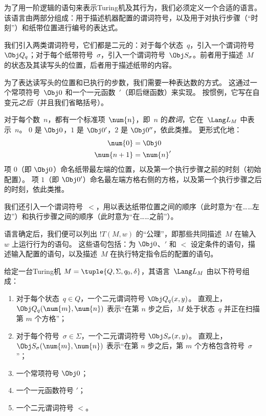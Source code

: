\documentclass[../../../include/open-logic-section]{subfiles}
\begin{document}

\begin{explain}
为了用一阶逻辑的语句来表示Turing机及其行为，我们必须定义一个合适的语言。
该语言由两部分组成：用于描述机器配置的谓词符号，以及用于对执行步骤（“时刻”）和纸带位置进行编号的表达式。

我们引入两类谓词符号，它们都是二元的：对于每个状态~\(q\)，引入一个谓词符号~\(\Obj Q_q\)；对于每个纸带符号~\(\sigma\)，引入一个谓词符号~\(\Obj S_\sigma\)。前者用于描述~\(M\) 的状态及其读写头的位置，后者用于描述纸带的内容。

为了表达读写头的位置和已执行的步数，我们需要一种表达数的方式。
这通过一个常项符号~\(\Obj 0\) 和一个一元函数~\(\prime\)（即后继函数）来实现。
按惯例，它写在自变元\emph{之后}（并且我们省略括号）。

对于每个数~\(n\)，都有一个标准项~\(\num{n}\)，即~\(n\) 的\emph{数词}，它在~\(\Lang L_M\) 中表示~\(n\)。
\(\num{0}\) 是 \(\Obj 0\)，\(\num{1}\) 是 \(\Obj 0'\)，\(\num{2}\) 是 \(\Obj 0''\)，依此类推。
更形式化地：
\begin{align*}
\num{0} & = \Obj 0 \\
\num{n+1} &= \num{n}'
\end{align*}
项 \(\num{0}\)（即 \(\Obj 0\)）命名纸带最左端的位置，以及第一个执行步骤之前的时刻（初始配置）。
项 \(\num{1}\)（即 \(\Obj 0'\)）命名最左端方格右侧的方格，以及第一个执行步骤之后的时刻，依此类推。

我们还引入一个谓词符号~\(<\)，用以表达纸带位置之间的顺序（此时意为“在……左边”）和执行步骤之间的顺序（此时意为“在……之前”）。

语言确定后，我们便可以列出 \(!T(M, w)\) 的“公理”，即那些共同描述~\(M\) 在输入~\(w\) 上运行行为的语句。
这些语句包括：为 \(\Obj 0\)、\(\prime\) 和 \(<\) 设定条件的语句，描述输入配置的语句，以及描述~\(M\) 在执行特定指令后的配置的语句。
\end{explain}

\begin{defn}
给定一台Turing机 $M = \tuple{Q, \Sigma, q_0, \delta}$，其语言~\(\Lang L_M\) 由以下符号组成：
\begin{enumerate}
\item 对于每个状态~\(q \in Q\)，一个二元谓词符号 \(\Obj Q_q(x, y)\)。
  直观上，$\Obj Q_q(\num{m}, \num{n})$ 表示“在第 \(n\) 步之后，\(M\) 处于状态~\(q\) 并正在扫描第 \(m\) 个方格”；
\item 对于每个符号~\(\sigma\in \Sigma\)，一个二元谓词符号 \(\Obj S_\sigma(x, y)\)。
  直观上，$\Obj S_\sigma(\num{m},
  \num{n})$ 表示“在第 \(n\) 步之后，第 \(m\) 个方格包含符号~\(\sigma\)”；
\item 一个常项符号 \(\Obj 0\)；
\item 一个一元函数符号 \(\prime\)；
\item 一个二元谓词符号 \(<\)。
\end{enumerate}
\end{defn}
\end{document}
